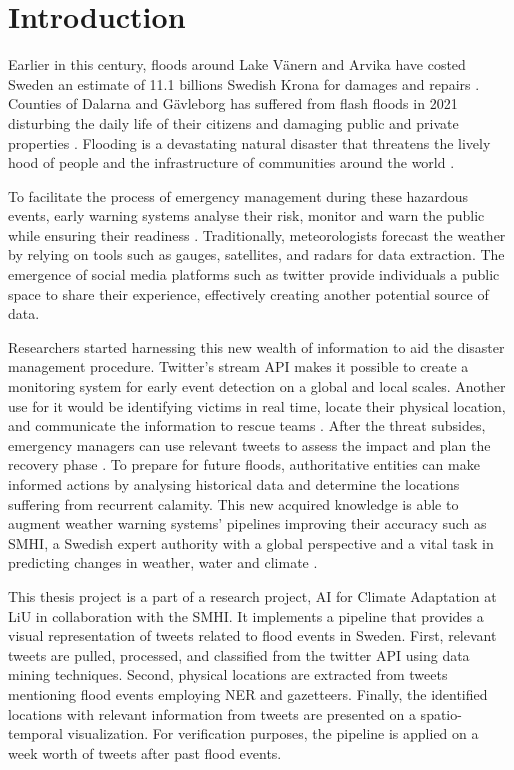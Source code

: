 \section{Introduction}

Earlier in this century, floods around Lake Vänern and Arvika have costed Sweden an estimate of 11.1
billions Swedish Krona for damages and repairs \cite{RiverFloodsSweden2022}. Counties of Dalarna and
Gävleborg has suffered from flash floods in 2021 disturbing the daily life of their citizens and
damaging public and private properties \cite{daviesSwedenFlashFloods2021}.  Flooding is a
devastating natural disaster that threatens the lively hood of people and the infrastructure of
communities around the world \cite{Floodlist2021}.

To facilitate the process of emergency management during these hazardous events, early warning
systems analyse their risk, monitor and warn the public while ensuring their readiness
\cite{contributorsEarlyWarningSystem2022}. Traditionally, meteorologists forecast the weather by
relying on tools such as gauges, satellites, and radars for data extraction. The emergence of social
media platforms such as twitter provide individuals a public space to share their experience,
effectively creating another potential source of data.

Researchers started harnessing this new wealth of information to aid the disaster management
procedure.  Twitter's stream API makes it possible to create a monitoring system for early event
detection on a global \cite{debruijnGlobalDatabaseHistoric2019b} and local
\cite{barkerDevelopmentNationalscaleRealtime2019} scales. Another use for it would be identifying
victims in real time, locate their physical location, and communicate the information to rescue
teams \cite{singhEventClassificationLocation2019c}. After the threat subsides, emergency
managers can use relevant tweets to assess the impact and plan the recovery phase
\cite{barkerDevelopmentNationalscaleRealtime2019}. To prepare for future floods, authoritative
entities can make informed actions by analysing historical data and determine the locations
suffering from recurrent calamity. This new acquired knowledge is able to augment weather warning
systems' pipelines improving their accuracy such as \ac{SMHI}, a Swedish expert authority with a
global perspective and a vital task in predicting changes in weather, water and climate \cite{SMHI2021}.


This thesis project is a part of a research project, AI for Climate Adaptation
\cite{nesetAI4ClimateAdaptation} at \ac{LiU} in collaboration with the \ac{SMHI}. It implements a
pipeline that provides a visual representation of tweets related to flood events in Sweden. First,
relevant tweets are pulled, processed, and classified from the twitter API using data mining
techniques. Second, physical locations are extracted from tweets mentioning flood events employing
\ac{NER} and gazetteers. Finally, the identified locations with relevant information from tweets are
presented on a spatio-temporal visualization. For verification purposes, the pipeline is applied on
a week worth of tweets after past flood events.
